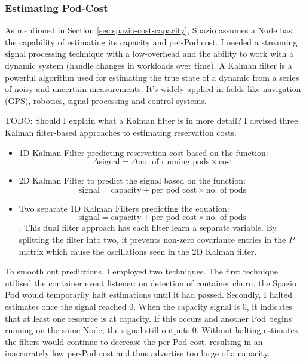 \subsubsection{Estimating Pod-Cost}
As mentioned in Section \ref{sec:spazio-cost-capacity}, Spazio assumes a Node
has the capability of estimating its capacity and per-Pod cost. I needed a
streaming signal processing technique with a low-overhead and the ability to
work with a dynamic system (handle changes in workloads over time). A Kalman filter
\cite{} is a powerful algorithm used for estimating the true state of a dynamic
from a series of noisy and uncertain measurements. It's widely applied in fields
like navigation (GPS), robotics, signal processing and control systems.

TODO: Should I explain what a Kalman filter is in more detail?
I devised three Kalman filter-based approaches to estimating reservation costs.
\begin{itemize}
    \item 1D Kalman Filter predicting reservation cost based on the function:
        \[\Delta \text{signal} = \Delta \text{no. of running pods} \times
        \text{cost}\]
    \item 2D Kalman Filter to predict the signal based on the function:
        \[\text{signal} = \text{capacity} + \text{per pod cost} \times \text{no.
        of pods}\]
    \item Two separate 1D Kalman Filters predicting the equation:
        \[\text{signal} = \text{capacity} + \text{per pod cost} \times \text{no.
        of pods}\].
        This dual filter approach has each filter learn a separate variable. By
        splitting the filter into two, it prevents non-zero covariance
        entries in the $P$ matrix which cause the oscillations seen in the 2D
        Kalman filter.
\end{itemize}
To smooth out predictions, I employed two techniques. The first technique
utilised the container event listener: on detection of container churn, the
Spazio Pod would temporarily halt estimations until it had passed. Secondly, I
halted estimates once the signal reached 0. When the capacity signal is 0, it
indicates that at least one resource is at capacity. If this occurs and another
Pod begins running on the same Node, the signal still outputs 0. Without halting
estimates, the filters would continue to decrease the per-Pod cost, resulting in
an inaccurately low per-Pod cost and thus advertise too large of a capacity.


